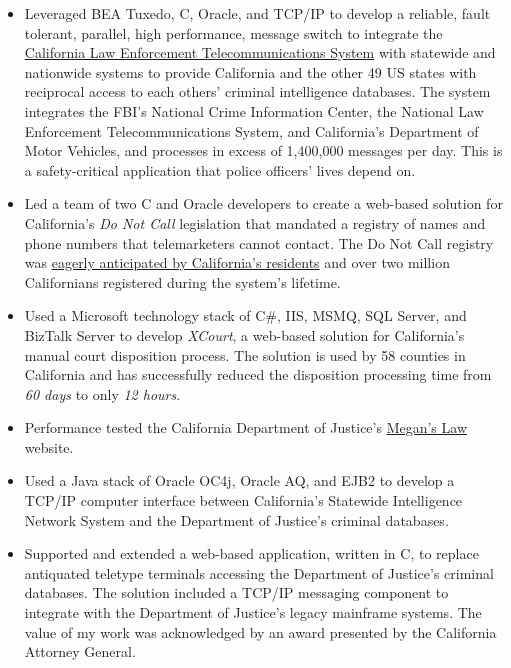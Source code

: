 \documentclass[a4paper,12pt]{article}
\begin{document}
\begin{itemize}

\item Leveraged BEA Tuxedo, C, Oracle, and TCP/IP to develop a reliable, fault tolerant, parallel, high performance, message switch to integrate the \href{http://definitions.uslegal.com/c/clets/}{California Law Enforcement Telecommunications System} with statewide and nationwide systems to provide California and the other 49 US states with reciprocal access to each others' criminal intelligence databases.  The system integrates the FBI's National Crime Information Center, the National Law Enforcement Telecommunications System, and California's Department of Motor Vehicles, and processes in excess of 1,400,000 messages per day.  This is a safety-critical application that police officers' lives depend on.

\item Led a team of two C and Oracle developers to create a web-based solution for California's \emph{Do Not Call} legislation that mandated a registry of names and phone numbers that telemarketers cannot contact.  The Do Not Call registry was \href{http://www.sfgate.com/cgi-bin/article.cgi?f=/c/a/2003/03/31/MN5478.DTL}{eagerly anticipated by California's residents} and over two million Californians registered during the system's lifetime.

\item Used a Microsoft technology stack of C\#, IIS, MSMQ, SQL Server, and BizTalk Server to develop \emph{XCourt}, a web-based solution for California's manual court disposition process. The solution is used by 58 counties in California and has successfully reduced the disposition processing time from \emph{60 days} to only \emph{12 hours}. 

\item Performance tested the California Department of Justice's \href{http://www.meganslaw.ca.gov/}{Megan's Law} website.

\item Used a Java stack of Oracle OC4j, Oracle AQ, and EJB2 to develop a TCP/IP computer interface between California's Statewide Intelligence Network System and the Department of Justice's criminal databases. 

\item Supported and extended a web-based application, written in C, to replace antiquated teletype terminals accessing the Department of Justice's criminal databases.  The solution included a TCP/IP messaging component to integrate with the Department of Justice's legacy mainframe systems.  The value of my work was acknowledged by an award presented by the California Attorney General.

\end{itemize}
\end{document}
